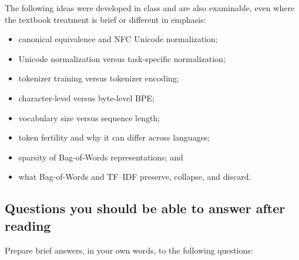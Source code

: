 \documentclass[11pt,a4paper]{article}
\begin{document}
The following ideas were developed in class and are also examinable, even where the textbook treatment is brief or different in emphasis:

\begin{itemize}
  \item canonical equivalence and NFC Unicode normalization;
  \item Unicode normalization versus task-specific normalization;
  \item tokenizer training versus tokenizer encoding;
  \item character-level versus byte-level BPE;
  \item vocabulary size versus sequence length;
  \item token fertility and why it can differ across languages;
  \item sparsity of Bag-of-Words representations; and
  \item what Bag-of-Words and TF--IDF preserve, collapse, and discard.
\end{itemize}

\subsection{Questions you should be able to answer after reading}

Prepare brief answers, in your own words, to the following questions:
\end{document}
